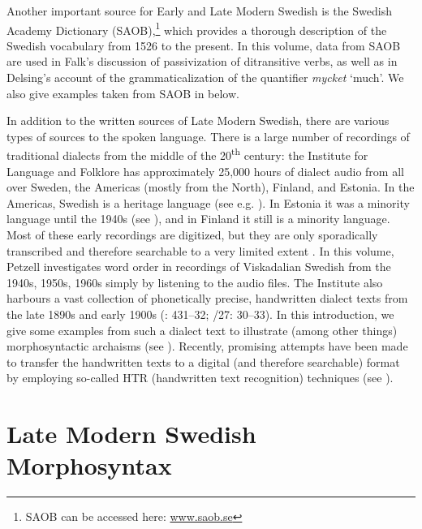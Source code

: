 \documentclass[output=paper]{langscibook}
\begin{document}
Another important source for Early and Late Modern Swedish is the Swedish Academy Dictionary (SAOB),\footnote{SAOB can be accessed here: \href{http://www.saob.se}{{www.saob.se}}} which provides a thorough description of the Swedish vocabulary from 1526 to the present. In this volume, data from SAOB are used in Falk’s discussion of passivization of ditransitive verbs, as well as in Delsing’s account of the grammaticalization of the quantifier \textit{mycket} ‘much’. We also give examples taken from SAOB in  below.



In addition to the written sources of Late Modern Swedish, there are various types of sources to the spoken language. There is a large number of recordings of traditional dialects from the middle of the 20\textsuperscript{th} century: the Institute for Language and Folklore has approximately 25,000 hours of dialect audio from all over Sweden, the Americas (mostly from the North), Finland, and Estonia. In the Americas, Swedish is a heritage language (see e.g. \citealt{Larsson2015}). In Estonia it was a minority language until the 1940s (see \citealt{Rosenkvist2018}), and in Finland it still is a minority language. Most of these early recordings are digitized, but they are only sporadically transcribed and therefore searchable to a very limited extent \citep{BergEtAl2019}. In this volume, Petzell investigates word order in recordings of Viskadalian Swedish from the 1940s, 1950s, 1960s simply by listening to the audio files. The Institute also harbours a vast collection of phonetically precise, handwritten dialect texts from the late 1890s and early 1900s (\citealt{Sellberg1993}: 431–32; \citealt{SOU1924}/27: 30–33). In this introduction, we give some examples from such a dialect text to illustrate (among other things) morphosyntactic archaisms (see ). Recently, promising attempts have been made to transfer the handwritten texts to a digital (and therefore searchable) format by employing so-called HTR (handwritten text recognition) techniques (see \citealt{Petzell2019,Petzell2020}).


\section{Late Modern Swedish Morphosyntax}\label{sec:intro:3}
\end{document}
